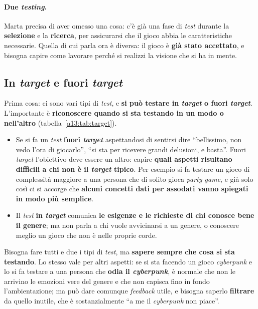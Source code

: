 \paragraph{Due \emph{testing}.} Marta precisa di aver omesso una cosa: c'è già una fase di
\emph{test} durante la \textbf{selezione} e la \textbf{ricerca}, per assicurarsi che il gioco
abbia le caratteristiche necessarie. Quella di cui parla ora è diversa: il gioco è
\textbf{già stato accettato}, e bisogna capire come lavorare perché si realizzi la visione
che si ha in mente.

\subsection{In \emph{target} e fuori \emph{target}}

Prima cosa: ci sono vari tipi di \emph{test}, e \textbf{si può testare in \emph{target} o
fuori \emph{target}}. L'importante è \textbf{riconoscere quando si sta testando in un modo o
nell'altro} (tabella~\ref{a13:tab:target}).
\begin{itemize}
  \item Se si fa un \emph{test} \textbf{fuori \emph{target}} aspettandosi di sentirsi dire
        ``bellissimo, non vedo l'ora di giocarlo'', ``si sta per ricevere grandi delusioni, e
        basta''. Fuori \emph{target} l'obiettivo deve essere un altro: capire \textbf{quali
        aspetti risultano difficili a chi non è il \emph{target} tipico}. Per esempio si fa
        testare un gioco di complessità maggiore a una persona che di solito gioca
        \emph{party game}, e già solo così ci si accorge che \textbf{alcuni concetti dati per
        assodati vanno spiegati in modo più semplice}.
  \item Il \emph{test} \textbf{in \emph{target}} comunica \textbf{le esigenze e le richieste di
        chi conosce bene il genere}; ma non parla a chi vuole avvicinarsi a un genere, o
        conoscere meglio un gioco che non è nelle proprie corde.
\end{itemize}
Bisogna fare tutti e due i tipi di \emph{test}, ma \textbf{sapere sempre che cosa si sta
testando}. Lo stesso vale per altri aspetti: se si sta facendo un gioco \emph{cyberpunk} e lo
si fa testare a una persona che \textbf{odia il \emph{cyberpunk}}, è normale che non le
arrivino le emozioni vere del genere e che non capisca fino in fondo l'ambientazione; ma può
dare comunque \emph{feedback} utile, e bisogna saperlo \textbf{filtrare} da quello inutile,
che è sostanzialmente ``a me il \emph{cyberpunk} non piace''.

